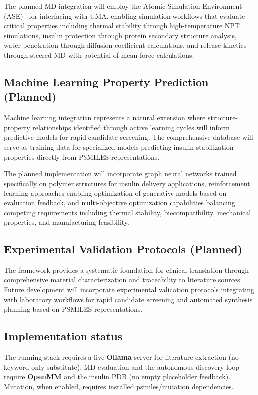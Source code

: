 \documentclass[]{fairmeta}
\begin{document}
The planned MD integration will employ the Atomic Simulation Environment (ASE)~\cite{larsen2017atomic} for interfacing with UMA, enabling simulation workflows that evaluate critical properties including thermal stability through high-temperature NPT simulations, insulin protection through protein secondary structure analysis, water penetration through diffusion coefficient calculations, and release kinetics through steered MD with potential of mean force calculations.

\subsection{Machine Learning Property Prediction (Planned)}

Machine learning integration represents a natural extension where structure-property relationships identified through active learning cycles will inform predictive models for rapid candidate screening. The comprehensive database will serve as training data for specialized models predicting insulin stabilization properties directly from PSMILES representations.

The planned implementation will incorporate graph neural networks trained specifically on polymer structures for insulin delivery applications, reinforcement learning approaches enabling optimization of generative models based on evaluation feedback, and multi-objective optimization capabilities balancing competing requirements including thermal stability, biocompatibility, mechanical properties, and manufacturing feasibility.

\subsection{Experimental Validation Protocols (Planned)}

The framework provides a systematic foundation for clinical translation through comprehensive material characterization and traceability to literature sources. Future development will incorporate experimental validation protocols integrating with laboratory workflows for rapid candidate screening and automated synthesis planning based on PSMILES representations.

\subsection{Implementation status}

The running stack requires a live \textbf{Ollama} server for literature extraction (no keyword-only substitute). MD evaluation and the autonomous discovery loop require \textbf{OpenMM} and the insulin PDB (no empty placeholder feedback). Mutation, when enabled, requires installed psmiles/mutation dependencies.
\end{document}
